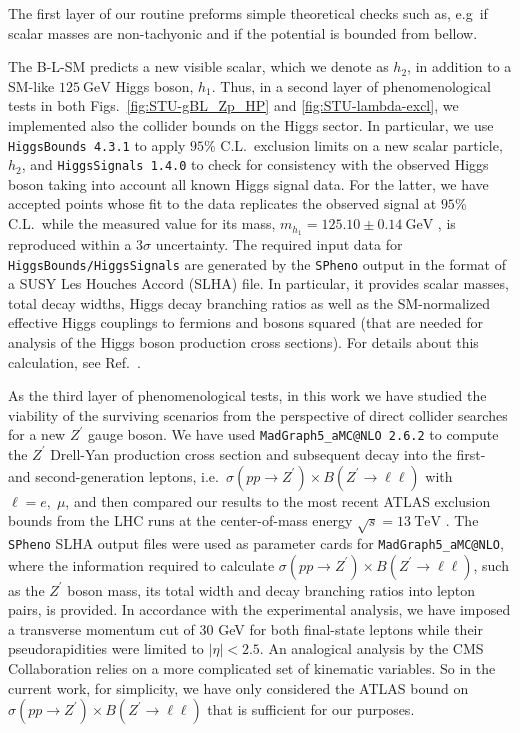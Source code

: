 \documentclass[10pt]{report}
\newcommand{\ro}[1]{\textrm{#1}}
\begin{document}
The first layer of our routine preforms simple theoretical checks such as, e.g~if scalar masses are non-tachyonic and if the potential is bounded from bellow. 

The B-L-SM predicts a new visible scalar, which we denote as $h_2$, in addition to a SM-like $125~\ro{GeV}$ Higgs boson, $h_1$. Thus, in a second layer of phenomenological tests in both Figs.~\ref{fig:STU-gBL_Zp_HP} and \ref{fig:STU-lambda-excl}, we implemented also the collider bounds on the Higgs sector. In particular, we use \texttt{HiggsBounds 4.3.1} \cite{Bechtle:2013wla} to apply $95\%$ C.L.~exclusion limits on a new scalar particle, $h_2$, and \texttt{HiggsSignals 1.4.0} \cite{Bechtle:2013xfa} to check for consistency with the observed Higgs boson taking into account all known Higgs signal data. For the latter, we have accepted points whose fit to the data replicates the observed signal at $95\%$ C.L.~while the measured value for its mass, $m_{h_1} = 125.10 \pm 0.14~\ro{GeV}$ \cite{Tanabashi:2018oca}, is reproduced within a $3\sigma$ uncertainty. The required input data for \texttt{HiggsBounds/HiggsSignals} are generated by the \texttt{SPheno} output in the format of a SUSY Les Houches Accord (SLHA) \cite{Skands:2003cj} file. In particular, it provides scalar masses, total decay widths, Higgs decay branching ratios as well as the SM-normalized effective Higgs couplings to fermions and bosons squared (that are needed for analysis of the Higgs boson production cross sections). For details about this calculation, see Ref.~\cite{Bechtle:2013wla}.

As the third layer of phenomenological tests, in this work we have studied the viability of the surviving scenarios from the perspective of direct collider searches for a new $Z^\prime$ gauge boson. We have used \texttt{MadGraph5\_aMC@NLO 2.6.2} \cite{Alwall:2014hca} to compute the $Z^\prime$ Drell-Yan production cross section and subsequent decay into the first- and second-generation leptons, i.e.~$ \sigma\left(pp \to Z^\prime\right) \times B\left(Z^\prime \to \ell \ell\right)$ with $\ell = e,\; \mu$, and then compared our results to the most recent ATLAS exclusion bounds from the LHC runs at the center-of-mass energy $\sqrt{s} = 13~\ro{TeV}$ \cite{Aad:2019fac}. The \texttt{SPheno} SLHA output files were used as parameter cards for \texttt{MadGraph5\_aMC@NLO}, where the information required to calculate $ \sigma\left(pp \to Z^\prime\right) \times B\left(Z^\prime \to \ell \ell\right)$, such as the $Z^\prime$ boson mass, its total width and decay branching ratios into lepton pairs, is provided. In accordance with the experimental analysis, we have imposed a transverse momentum cut of 30 GeV for both final-state leptons while their pseudorapidities were limited to $|\eta| < 2.5$. An analogical analysis by the CMS Collaboration \cite{Sirunyan:2018exx} relies on a more complicated set of kinematic variables. So in the current work, for simplicity, we have only considered the ATLAS bound on $ \sigma\left(pp \to Z^\prime\right) \times B\left(Z^\prime \to \ell \ell\right)$ that is sufficient for our purposes.
\end{document}
